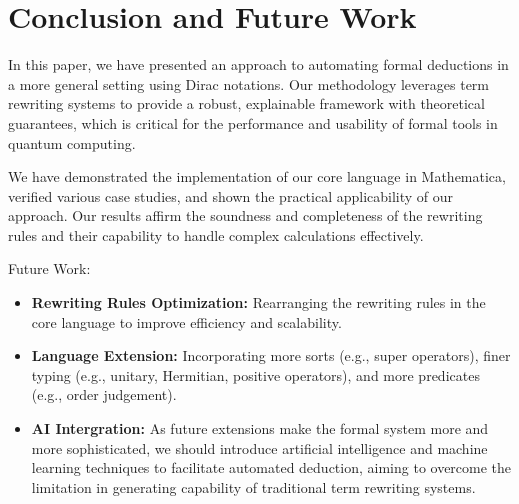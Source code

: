 
\section{Conclusion and Future Work}

In this paper, we have presented an approach to automating formal deductions in a more general setting using Dirac notations. Our methodology leverages term rewriting systems to provide a robust, explainable framework with theoretical guarantees, which is critical for the performance and usability of formal tools in quantum computing.

We have demonstrated the implementation of our core language in Mathematica, verified various case studies, and shown the practical applicability of our approach. Our results affirm the soundness and completeness of the rewriting rules and their capability to handle complex calculations effectively.


Future Work:
\begin{itemize}
  \item \textbf{Rewriting Rules Optimization:} 
  Rearranging the rewriting rules in the core language to improve efficiency and scalability.
  \item \textbf{Language Extension:} 
  Incorporating more sorts (e.g., super operators), finer typing (e.g., unitary, Hermitian, positive operators), and more predicates (e.g., order judgement).
  \item \textbf{AI Intergration:} As future extensions make the formal system more and more sophisticated, we should introduce artificial intelligence and machine learning techniques to facilitate automated deduction, aiming to overcome the limitation in generating capability of traditional term rewriting systems.
\end{itemize}
